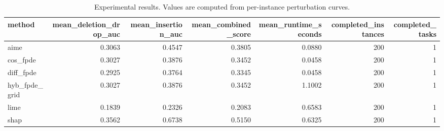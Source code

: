 \begin{table}[t]
\caption{Experimental results. Values are computed from per-instance perturbation curves.}
\label{tab:main_results_computed}
\centering
\begin{tabular}{lrrrrrr}
\toprule
method & mean\_deletion\_drop\_auc & mean\_insertion\_auc & mean\_combined\_score & mean\_runtime\_seconds & completed\_instances & completed\_tasks \\
\midrule
aime & 0.3063 & 0.4547 & 0.3805 & 0.0880 & 200 & 1 \\
cos\_fpde & 0.3027 & 0.3876 & 0.3452 & 0.0458 & 200 & 1 \\
diff\_fpde & 0.2925 & 0.3764 & 0.3345 & 0.0458 & 200 & 1 \\
hyb\_fpde\_grid & 0.3027 & 0.3876 & 0.3452 & 1.1002 & 200 & 1 \\
lime & 0.1839 & 0.2326 & 0.2083 & 0.6583 & 200 & 1 \\
shap & 0.3562 & 0.6738 & 0.5150 & 0.6325 & 200 & 1 \\
\bottomrule
\end{tabular}

\end{table}
